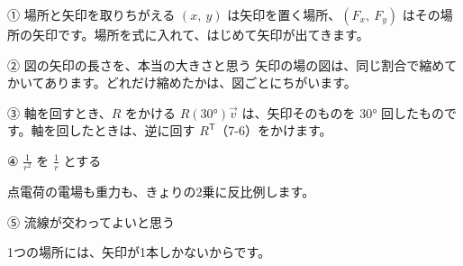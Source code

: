 
\begin{tsumazuki}{① 場所と矢印を取りちがえる}
$(x,\ y)$ は矢印を置く場所、$(F_x,\ F_y)$ はその場所の矢印です。場所を式に入れて、はじめて矢印が出てきます。
\end{tsumazuki}

\begin{tsumazuki}{② 図の矢印の長さを、本当の大きさと思う}
矢印の場の図は、同じ割合で縮めてかいてあります。どれだけ縮めたかは、図ごとにちがいます。
\end{tsumazuki}

\begin{tsumazuki}{③ 軸を回すとき、$R$ をかける}
$R(30°)\vec v$ は、矢印そのものを $30°$ 回したものです。軸を回したときは、逆に回す $R^{\mathsf T}$（7-6）をかけます。
\end{tsumazuki}

\begingroup{}%
\noindent\begin{minipage}[t]{0.485\linewidth}\vspace{0pt}
\begin{tsumazuki}{④ $\frac{1}{r^2}$ を $\frac{1}{r}$ とする}
\raggedright{}
点電荷の電場も重力も、きょりの2乗に反比例します。
\end{tsumazuki}
\end{minipage}\hfill
\begin{minipage}[t]{0.485\linewidth}\vspace{0pt}
\begin{tsumazuki}{⑤ 流線が交わってよいと思う}
\raggedright{}
1つの場所には、矢印が1本しかないからです。
\end{tsumazuki}
\end{minipage}\par
\endgroup


